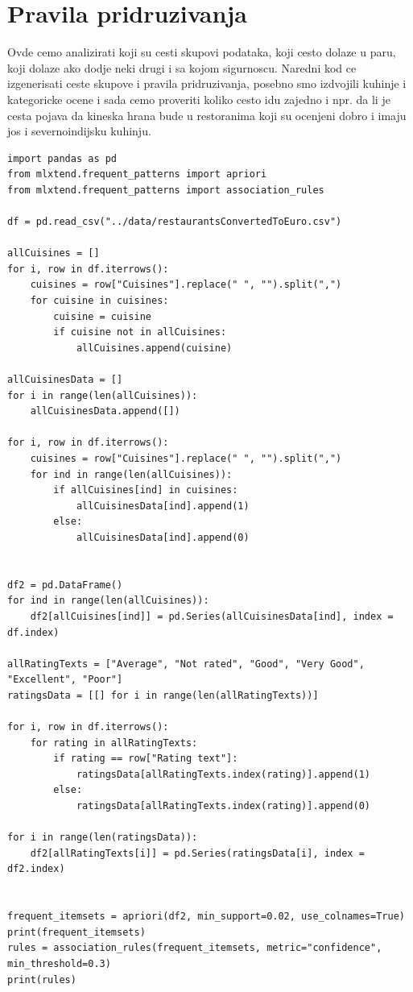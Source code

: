 \documentclass[11pt]{article} %
\begin{document}
\newpage
\section{Pravila pridruzivanja}
Ovde cemo analizirati koji su cesti skupovi podataka, koji cesto dolaze u paru, koji dolaze ako dodje neki drugi i sa kojom sigurnoscu.
Naredni kod ce izgenerisati ceste skupove i pravila pridruzivanja, posebno smo izdvojili kuhinje i kategoricke ocene i sada cemo proveriti 
koliko cesto idu zajedno i npr. da li je cesta pojava da kineska hrana bude u restoranima koji su ocenjeni dobro i imaju jos i severnoindijsku kuhinju.

\begin{lstlisting}
import pandas as pd
from mlxtend.frequent_patterns import apriori
from mlxtend.frequent_patterns import association_rules

df = pd.read_csv("../data/restaurantsConvertedToEuro.csv")

allCuisines = []
for i, row in df.iterrows():
    cuisines = row["Cuisines"].replace(" ", "").split(",")
    for cuisine in cuisines:
        cuisine = cuisine
        if cuisine not in allCuisines:
            allCuisines.append(cuisine)

allCuisinesData = []
for i in range(len(allCuisines)):
    allCuisinesData.append([])

for i, row in df.iterrows():
    cuisines = row["Cuisines"].replace(" ", "").split(",")
    for ind in range(len(allCuisines)):
        if allCuisines[ind] in cuisines:
            allCuisinesData[ind].append(1)
        else:
            allCuisinesData[ind].append(0)


df2 = pd.DataFrame()
for ind in range(len(allCuisines)):
    df2[allCuisines[ind]] = pd.Series(allCuisinesData[ind], index = df.index)

allRatingTexts = ["Average", "Not rated", "Good", "Very Good", "Excellent", "Poor"]
ratingsData = [[] for i in range(len(allRatingTexts))]

for i, row in df.iterrows():
    for rating in allRatingTexts:
        if rating == row["Rating text"]:
            ratingsData[allRatingTexts.index(rating)].append(1)
        else:
            ratingsData[allRatingTexts.index(rating)].append(0)

for i in range(len(ratingsData)):
    df2[allRatingTexts[i]] = pd.Series(ratingsData[i], index = df2.index)

    
frequent_itemsets = apriori(df2, min_support=0.02, use_colnames=True)
print(frequent_itemsets)
rules = association_rules(frequent_itemsets, metric="confidence", min_threshold=0.3)
print(rules)
\end{lstlisting}
\end{document}
